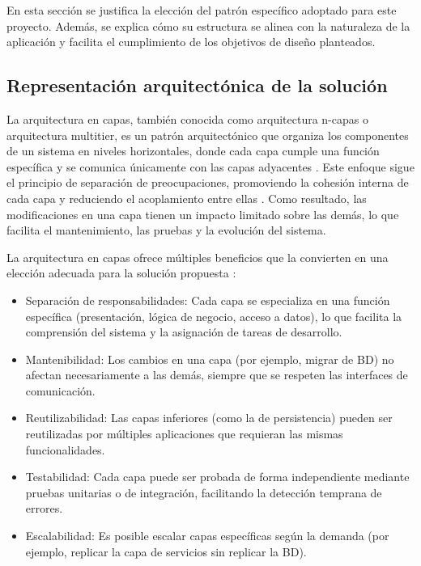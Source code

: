 En esta sección se justifica la elección del patrón específico adoptado para este proyecto. Además, se
explica cómo su estructura se alinea con la naturaleza de la aplicación y facilita el cumplimiento de los
objetivos de diseño planteados.


\subsection{Representación arquitectónica de la solución}

La arquitectura en capas, también conocida como arquitectura n-capas o arquitectura multitier, es un patrón 
arquitectónico que organiza los componentes de un sistema en niveles horizontales, donde cada capa cumple una 
función específica y se comunica únicamente con las capas adyacentes \citep{bass2012software}. 
Este enfoque sigue el principio de separación de preocupaciones, 
promoviendo la cohesión interna de cada capa y reduciendo el acoplamiento entre ellas \citep{gamma1995design}. 
Como resultado, las modificaciones en una capa tienen un impacto limitado sobre las demás, lo que facilita el 
mantenimiento, las pruebas y la evolución del sistema.

La arquitectura en capas ofrece múltiples beneficios que la convierten en una elección adecuada para 
la solución propuesta \citep{rojas2021arquitectura}:

\begin{itemize}
    \item Separación de responsabilidades: Cada capa se especializa en una función específica 
	(presentación, lógica de negocio, acceso a datos), lo que facilita la comprensión del sistema y la 
	asignación de tareas de desarrollo.
    
    \item Mantenibilidad: Los cambios en una capa (por ejemplo, migrar de \ac{BD}) no 
	afectan necesariamente a las demás, siempre que se respeten las interfaces de comunicación.
    
    \item Reutilizabilidad: Las capas inferiores (como la de persistencia) pueden ser reutilizadas por 
	múltiples aplicaciones que requieran las mismas funcionalidades.
    
    \item Testabilidad: Cada capa puede ser probada de forma independiente mediante pruebas unitarias o 
	de integración, facilitando la detección temprana de errores.
    
    \item Escalabilidad: Es posible escalar capas específicas según la demanda (por ejemplo, replicar la 
	capa de servicios sin replicar la \ac{BD}).
\end{itemize}


